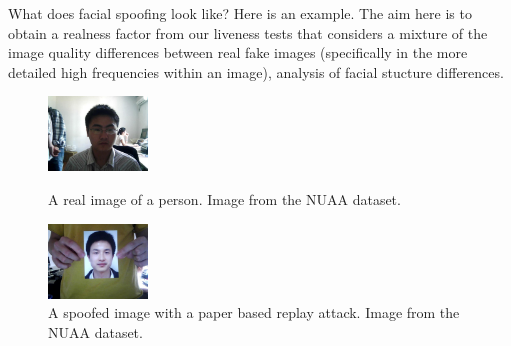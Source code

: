 \documentclass[final]{beamer}
\begin{document}
\begin{frame}{}
\begin{columns}[t]
\begin{column}{.48\linewidth}
        \begin{block}{What does facial spoofing look like?}
          Here is an example. The aim here is to obtain a realness factor from our liveness tests that considers a mixture of
          the image quality differences between real fake images (specifically in the more detailed high frequencies within an image),
          analysis of facial stucture differences.
          \begin{figure}[!tbp]
            \centering
            \begin{minipage}[b]{0.3\textwidth}
              \centering
              \includegraphics[width=100px]{RealImage.jpg}
              \caption{A real image of a person. Image from the NUAA dataset.}
            \end{minipage}
            \begin{minipage}[b]{0.3\textwidth}
              \centering
              \includegraphics[width=100px]{SpoofedImage.jpg}
            \caption{A spoofed image with a paper based replay attack. Image from the NUAA dataset.}
            \end{minipage}
          \end{figure}
        

\end{block}
\end{column}
\end{columns}
\end{frame}
\end{document}
